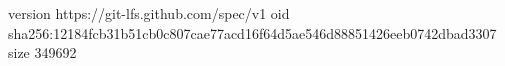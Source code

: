 version https://git-lfs.github.com/spec/v1
oid sha256:12184fcb31b51cb0c807cae77acd16f64d5ae546d88851426eeb0742dbad3307
size 349692
